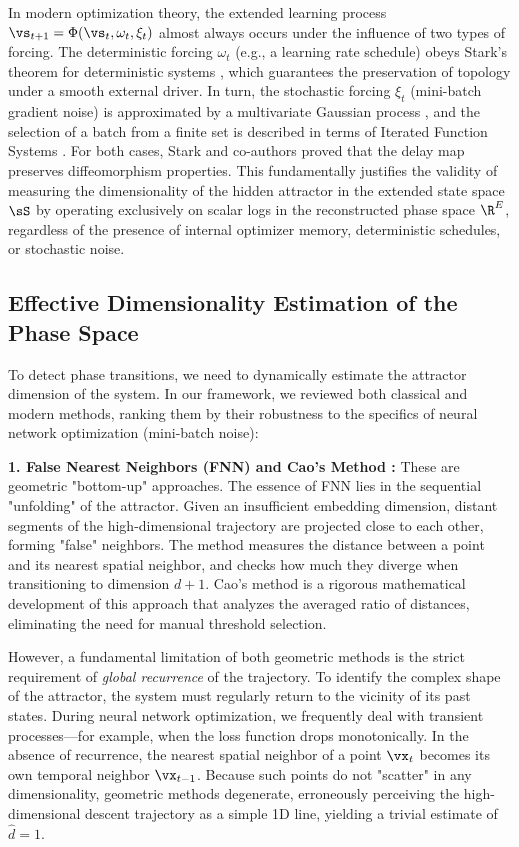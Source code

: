 \documentclass{article}
\begin{document}
In modern optimization theory, the extended learning process $\vs_{t+1} = \Phi(\vs_t, \omega_t, \xi_t)$ almost always occurs under the influence of two types of forcing. The deterministic forcing $\omega_t$ (e.g., a learning rate schedule) obeys Stark's theorem for deterministic systems \cite{stark1999delay}, which guarantees the preservation of topology under a smooth external driver. In turn, the stochastic forcing $\xi_t$ (mini-batch gradient noise) is approximated by a multivariate Gaussian process \cite{mandt2017stochastic}, and the selection of a batch from a finite set is described in terms of Iterated Function Systems \cite{stark2003delay}. For both cases, Stark and co-authors proved that the delay map preserves diffeomorphism properties. This fundamentally justifies the validity of measuring the dimensionality of the hidden attractor in the extended state space $\sS$ by operating exclusively on scalar logs in the reconstructed phase space $\R^E$, regardless of the presence of internal optimizer memory, deterministic schedules, or stochastic noise.

\subsection{Effective Dimensionality Estimation of the Phase Space}\label{sec:theory_dim}

To detect phase transitions, we need to dynamically estimate the attractor dimension of the system. In our framework, we reviewed both classical and modern methods, ranking them by their robustness to the specifics of neural network optimization (mini-batch noise):

\textbf{1. False Nearest Neighbors (FNN) \cite{kennel1992determining} and Cao's Method \cite{cao1997practical}:}
These are geometric "bottom-up" approaches. The essence of FNN lies in the sequential "unfolding" of the attractor. Given an insufficient embedding dimension, distant segments of the high-dimensional trajectory are projected close to each other, forming "false" neighbors. The method measures the distance between a point and its nearest spatial neighbor, and checks how much they diverge when transitioning to dimension $d+1$. Cao's method is a rigorous mathematical development of this approach that analyzes the averaged ratio of distances, eliminating the need for manual threshold selection.

However, a fundamental limitation of both geometric methods is the strict requirement of \textit{global recurrence} of the trajectory. To identify the complex shape of the attractor, the system must regularly return to the vicinity of its past states. During neural network optimization, we frequently deal with transient processes—for example, when the loss function drops monotonically. In the absence of recurrence, the nearest spatial neighbor of a point $\vx_t$ becomes its own temporal neighbor $\vx_{t-1}$. Because such points do not "scatter" in any dimensionality, geometric methods degenerate, erroneously perceiving the high-dimensional descent trajectory as a simple 1D line, yielding a trivial estimate of $\hat{d}=1$.
\end{document}
